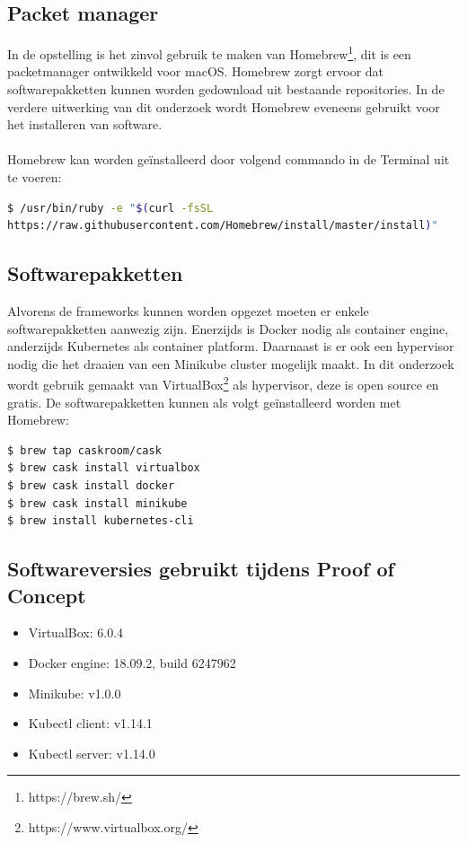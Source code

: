 \subsection{Packet manager}
In de opstelling is het zinvol gebruik te maken van Homebrew\footnote{https://brew.sh/}, dit is een packetmanager ontwikkeld voor macOS. Homebrew zorgt ervoor dat softwarepakketten kunnen worden gedownload uit bestaande repositories. In de verdere uitwerking van dit onderzoek wordt Homebrew eveneens gebruikt voor het installeren van software.
\\\\
Homebrew kan worden geïnstalleerd door volgend commando in de Terminal uit te voeren: 
\begin{lstlisting}[language=bash]
$ /usr/bin/ruby -e "$(curl -fsSL 
https://raw.githubusercontent.com/Homebrew/install/master/install)"
\end{lstlisting}

\subsection{Softwarepakketten}
\label{sec:software}
Alvorens de frameworks kunnen worden opgezet moeten er enkele softwarepakketten aanwezig zijn. Enerzijds is Docker nodig als container engine, anderzijds Kubernetes als container platform. Daarnaast is er ook een hypervisor nodig die het draaien van een Minikube cluster mogelijk maakt. In dit onderzoek wordt gebruik gemaakt van VirtualBox\footnote{https://www.virtualbox.org/} als hypervisor, deze is open source en gratis. De softwarepakketten kunnen als volgt geïnstalleerd worden met Homebrew:        
\begin{lstlisting}[language=bash]
$ brew tap caskroom/cask
$ brew cask install virtualbox
$ brew cask install docker
$ brew cask install minikube
$ brew install kubernetes-cli
\end{lstlisting}

\subsection{Softwareversies gebruikt tijdens Proof of Concept}
\begin{itemize}
    \item VirtualBox: 6.0.4 
    \item Docker engine: 18.09.2, build 6247962
    \item Minikube: v1.0.0
    \item Kubectl client: v1.14.1
    \item Kubectl server: v1.14.0
\end{itemize}

